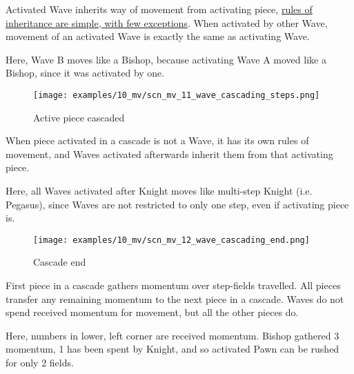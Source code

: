 
Activated Wave inherits way of movement from activating piece,
\hyperref[sec:Appendix/Movement of Wave]{rules of inheritance are simple, with few exceptions}.
When activated by other Wave, movement of an activated Wave is exactly the same as
activating Wave.



Here, Wave B moves like a Bishop, because activating Wave A moved like a Bishop,
since it was activated by one.

\clearpage %

\vspace*{-5.0ex}
\noindent
\begin{figure}[h]
\texttt{[image: examples/10\_mv/scn\_mv\_11\_wave\_cascading\_steps.png]}
\caption{Active piece cascaded}
\label{fig:scn_mv_11_wave_cascading_steps}
\end{figure}

When piece activated in a cascade is not a Wave, it has its own rules of movement, and
Waves activated afterwards inherit them from that activating piece.

Here, all Waves activated after Knight moves like multi-step Knight (i.e. Pegasus),
since Waves are not restricted to only one step, even if activating piece is.

\clearpage %

\vspace*{-5.0ex}
\noindent
\begin{figure}[h]
\texttt{[image: examples/10\_mv/scn\_mv\_12\_wave\_cascading\_end.png]}
\caption{Cascade end}
\label{fig:scn_mv_12_wave_cascading_end}
\end{figure}

First piece in a cascade gathers momentum over step-fields travelled. All pieces
transfer any remaining momentum to the next piece in a cascade. Waves do not spend
received momentum for movement, but all the other pieces do.

Here, numbers in lower, left corner are received momentum. Bishop gathered 3 momentum,
1 has been spent by Knight, and so activated Pawn can be rushed for only 2 fields.

